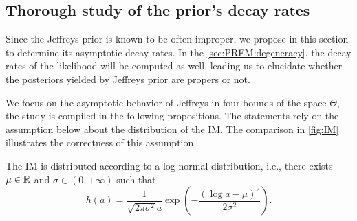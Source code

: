     



    \subsection{Thorough study of the prior's decay rates}\label{sec:PREM:subsec:jeffasymp}


    Since the Jeffreys prior is known to be often improper, we propose in this section to determine its asymptotic decay rates. In the \cref{sec:PREM:degeneracy}, the decay rates of the likelihood will be computed as well, leading us to elucidate whether the posteriors yielded by Jeffreys prior are propers or not.

    We focus on the asymptotic behavior of Jeffreys in four bounds of the space $\Theta$, the study is compiled in the following propositions. 
    The statements rely on the assumption below about the distribution of the IM. %
    The comparison in \cref{fig:IM} illustrates the correctness of this assumption.


    \begin{assu}
        The IM is distributed according to a log-normal distribution, i.e., there exists $\mu\in \mathbb{R}$ and $\sigma\in (0,+\infty)$ such that 
    \begin{equation}
        h(a) = \frac{1}{\sqrt{2\pi\sigma^2}a}\exp\left({-\frac{(\log a-\mu)^2}{2\sigma^2}}\right).
    \end{equation}
    \end{assu}

